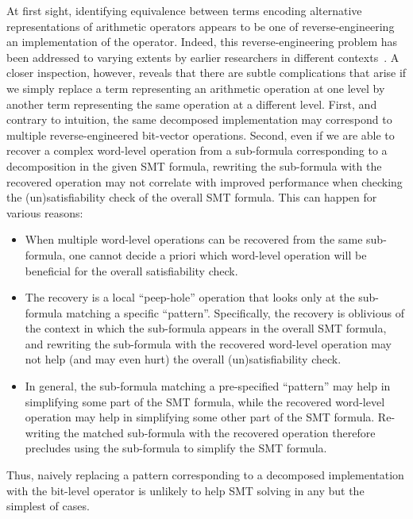 At first sight, identifying equivalence between terms encoding
alternative representations of arithmetic operators appears to be one
of reverse-engineering an implementation of the operator.  Indeed,
this reverse-engineering problem has been addressed to varying extents
by earlier researchers in different
contexts~\cite{earlier-pat-match-synopsys}.  A closer inspection,
however, reveals that there are subtle complications that arise if we
simply replace a term representing an arithmetic operation at one
level by another term representing the same operation at a different
level. First, and contrary to intuition, the same decomposed
implementation may correspond to multiple reverse-engineered
bit-vector operations.  Second, even if we are able to recover a
complex word-level operation from a sub-formula corresponding to a
decomposition in the given SMT formula, rewriting the sub-formula with
the recovered operation may not correlate with improved performance
when checking the (un)satisfiability check of the overall SMT formula.
This can happen for various reasons:
\begin{itemize}
\item When multiple word-level operations can be recovered from the
  same sub-formula, one cannot decide a priori which word-level
  operation will be beneficial for the overall satisfiability check.
\item The recovery is a local ``peep-hole'' operation that looks only
  at the sub-formula matching a specific ``pattern''.  Specifically,
  the recovery is oblivious of the context in which the sub-formula
  appears in the overall SMT formula, and rewriting the sub-formula
  with the recovered word-level operation may not help (and may even
  hurt) the overall (un)satisfiability check.  
\item In general, the sub-formula matching a pre-specified ``pattern''
  may help in simplifying some part of the SMT formula, while the
  recovered word-level operation may help in simplifying some other
  part of the SMT formula.  Re-writing the matched sub-formula with
  the recovered operation therefore precludes using the sub-formula
  to simplify the SMT formula.
\end{itemize}
Thus, naively replacing a pattern corresponding to a decomposed
implementation with the bit-level operator is unlikely to help SMT
solving in any but the simplest of cases.

